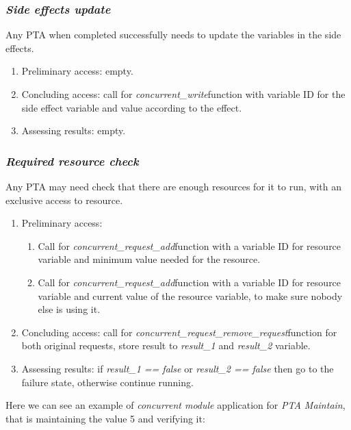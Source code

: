 \subsubsection{\textit{Side effects update} \label{memory_module_applications_side_effects_update}}
Any PTA when completed successfully needs to update the variables in the side effects.
\begin{enumerate} 
\item Preliminary access: empty.
\item Concluding access: call for \textcolor{ColorUppaalFunction}{\textit{concurrent_write}}​ function with variable ID for the side effect variable and value according to the effect. 
\item Assessing results: empty.
\end{enumerate}
\subsubsection{\textit{Required resource check} \label{memory_module_applications_required_resource_check}}
Any PTA may need check that there are enough resources for it to run, with an exclusive access to resource.
\begin{enumerate} 
\item Preliminary access:
\begin{enumerate} 
\item Call for \textcolor{ColorUppaalFunction}{\textit{concurrent_request_add}}​ function with a variable ID for resource variable and minimum value needed for the resource. 
\item Call for \textcolor{ColorUppaalFunction}{\textit{concurrent_request_add}}​ function with a variable ID for resource variable and current value of the resource variable, to make sure nobody else is using it.
\end{enumerate} 
\item Concluding access: call for \textcolor{ColorUppaalFunction}{\textit{concurrent_request_remove_request}}​ function for both original requests, store result to \textcolor{ColorEdgeGuard}{\textit{result_1}} and \textcolor{ColorEdgeGuard}{\textit{result_2}} variable. 
\item Assessing results: if \textcolor{ColorEdgeGuard}{\textit{result_1 == false}} or \textcolor{ColorEdgeGuard}{\textit{result_2 == false}} then go to the failure state, otherwise continue running.
\end{enumerate}    
Here we can see an example of \textit{concurrent module} application for \textit{PTA Maintain}, that is maintaining the value 5 and verifying it:   \clearpage
